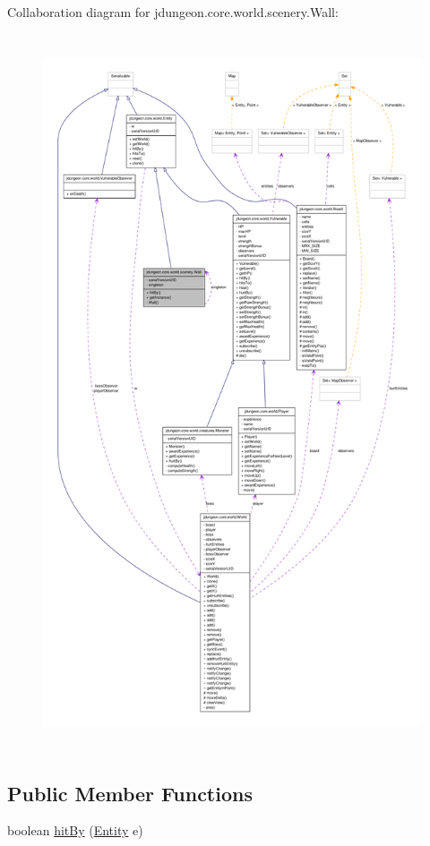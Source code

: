 Collaboration diagram for jdungeon.core.world.scenery.Wall:
\nopagebreak
\begin{figure}[H]
\begin{center}
\leavevmode
\includegraphics[height=600pt]{classjdungeon_1_1core_1_1world_1_1scenery_1_1_wall__coll__graph}
\end{center}
\end{figure}
\subsection*{Public Member Functions}
\begin{DoxyCompactItemize}
\item 
boolean \hyperlink{classjdungeon_1_1core_1_1world_1_1scenery_1_1_wall_a06739d9d6844918017ab281a41f08910}{hitBy} (\hyperlink{classjdungeon_1_1core_1_1world_1_1_entity}{Entity} e)
\end{DoxyCompactItemize}
